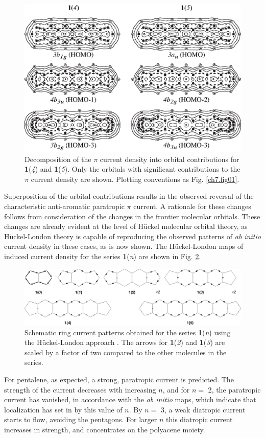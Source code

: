 \begin{figure}[hbp]
\center
\includegraphics{indacene/figures/figure3c.eps}
\caption{Decomposition of the $\pi$ current density into orbital contributions for \textbf{1}(\textit{4}) and \textbf{1}(\textit{5}). Only the orbitals with significant contributions to the $\pi$ current density are shown. Plotting conventions as Fig. \ref{ch7.fig01}.}
\label{ch7.fig03c}
\end{figure}
Superposition of the orbital contributions results in the observed reversal of the characteristic anti-aromatic paratropic $\pi$ current. A rationale for these changes follows from consideration of the changes in the frontier molecular orbitals. These changes are already evident at the level of H\"uckel molecular orbital theory, as H\"uckel-London theory  \cite{r26,r27} is capable of reproducing the observed patterns of \textit{ab initio} current density in these cases, as is now shown.
\clearpage
\newpage
The H\"uckel-London  \cite{r26,r27} maps of induced current density for the series \textbf{1}(\textit{n}) are shown in Fig. \ref{ch7.fig04}.
\begin{figure}[hb]
\center
\includegraphics[scale=0.78]{indacene/figures/figure4.eps}
\caption{Schematic ring current patterns obtained for the series \textbf{1}(\textit{n}) using the H\"uckel-London approach \cite{r26,r27}. The arrows for \textbf{1}(\textit{2}) and \textbf{1}(\textit{3}) are scaled by a factor of two compared to the other molecules in the series.}
\label{ch7.fig04}
\end{figure}
For pentalene, as expected, a strong, paratropic current is predicted. The strength of the current decreases with increasing $n$, and for {$n =$ 2}, the paratropic current has vanished, in accordance with the \textit{ab initio} maps, which indicate that localization has set in by this value of $n$. By {$n =$ 3}, a weak diatropic current starts to flow, avoiding the pentagons. For larger $n$ this diatropic current increases in strength, and concentrates on the polyacene moiety.

